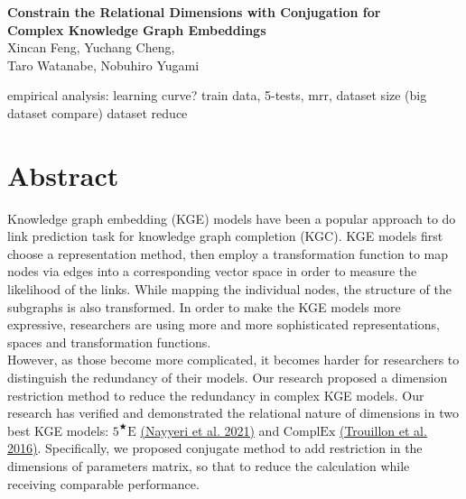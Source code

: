 \documentclass[9pt]{ctexart}
\theoremstyle{definition}
\begin{document}
\begin{center}
    {\LARGE\textbf{Constrain the Relational Dimensions with Conjugation for \\ \vspace{0.25cm} Complex Knowledge Graph Embeddings}}\\
    \bigskip
    {\large Xincan Feng, Yuchang Cheng, \\Taro Watanabe, Nobuhiro Yugami}
\end{center}
    \vspace{1.8cm}

    empirical analysis: learning curve? train data, 5-tests, mrr, dataset size (big dataset compare)
    dataset reduce

\section{Abstract}
Knowledge graph embedding (KGE) models have been a popular approach to do link prediction task for knowledge graph completion (KGC).
KGE models first choose a representation method, then employ a transformation function to map nodes via edges into a corresponding vector space in order to measure the likelihood of the links.
While mapping the individual nodes, the structure of the subgraphs is also transformed.
In order to make the KGE models more expressive, researchers are using more and more sophisticated representations, spaces and transformation functions.\\
However, as those become more complicated, it becomes harder for researchers to distinguish the redundancy of their models.
Our research proposed a dimension restriction method to reduce the redundancy in complex KGE models.
Our research has verified and demonstrated the relational nature of dimensions in two best KGE models: $5^{\bigstar}\mathrm{E}$
\hyperlink{Nay21}{(Nayyeri et al. 2021)}
and $\mathrm{ComplEx}$
\hyperlink{Tro16}{(Trouillon et al. 2016)}.
Specifically, we proposed conjugate method to add restriction in the dimensions of parameters matrix, so that to reduce the calculation while receiving comparable performance.
\end{document}
